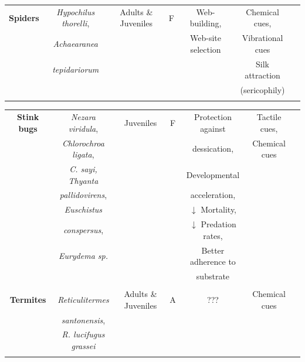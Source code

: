 \begin{landscape}
\begin{table}
\begin{tabular*}{\linewidth}{@{\extracolsep{\fill}}ccccccc}
          \textbf{Spiders}	&\textit{Hypochilus thorelli},	&Adults \& Juveniles	&F	&Web-building,	&Chemical cues,	&\cite{hodge_conspecific_1997}\\
          &\textit{Achaearanea}	&	&	&Web-site selection	&Vibrational cues	&\\
          &\textit{tepidariorum}	&	&	&	&Silk attraction	&\\
          &	&	&	&	&(sericophily)	&\\
          &	&	&	&	&	&\\
       
    \end{tabular*}
    \end{table}
		
\end{landscape} 
          
\begin{landscape}
\begin{table}
	
	\label{tab:mixedsp4}
	\centering
	\begin{tabular*}{\linewidth}{@{\extracolsep{\fill}}ccccccc}          
     	\textbf{Stink bugs}	&\textit{Nezara viridula},	&Juveniles	&F	&Protection against	&Tactile cues,	&\citep{ishiwatari_studies_1976,fucarino_chemical_2004}\\ 
        &\textit{Chlorochroa ligata},	&	&	&dessication,	&Chemical cues	&\\
        &\textit{C. sayi, Thyanta}	&	&	&Developmental	&	&\\
        &\textit{pallidovirens},	&	&	&acceleration,	&	&\\
        &\textit{Euschistus}	&	&	&$\downarrow$ Mortality,	&	&\\
        &\textit{conspersus},	&	&	&$\downarrow$ Predation rates,	&	&\\
        &\textit{Eurydema sp.}	&	&	&Better adherence to	&	&\\
        &	&	&	&substrate	&	&\\
        &	&	&	&	&	&\\
     
     	\textbf{Termites}	&\textit{Reticulitermes}	&Adults \& Juveniles	&A	&???	&Chemical cues	&\cite{vauchot_regulation_1996}\\
        &\textit{santonensis},	&	&	&	&	&\\
        &\textit{R. lucifugus grassei}	&	&	&	&	&\\
        &	&	&	&	&	&\\
        

\end{tabular*}
\end{table}
\end{landscape}
